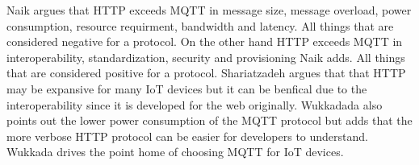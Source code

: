 Naik argues that HTTP exceeds MQTT in message size, message overload, power consumption, resource requirment, bandwidth and latency. 
All things that are considered negative for a protocol. \cite{Naik2017}
On the other hand HTTP exceeds MQTT in interoperability, standardization, security and provisioning Naik adds. \cite{Naik2017}
All things that are considered positive for a protocol.
Shariatzadeh argues that that HTTP may be expansive for many IoT devices but it can be benfical due to the interoperability since it is developed for the web originally. \cite{Shariatzadeh2016}
Wukkadada also points out the lower power consumption of the MQTT protocol but adds that the more verbose HTTP protocol can be easier for developers to understand. \cite{Wukkadada2018}
Wukkada drives the point home of choosing MQTT for IoT devices. \cite{Wukkadada2018}
